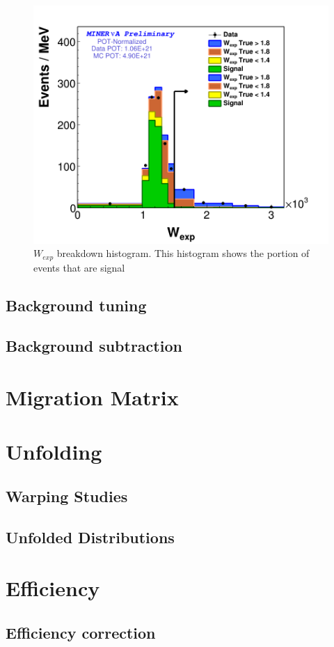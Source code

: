 \begin{figure}
    \centering
    \includegraphics{Figures/Chapter4/BGStudies/Breakdown_WSideband_wexp_fit_1Pi_PN_.png}
    \caption{$W_{exp}$ breakdown histogram. This histogram shows the portion of events that are signal }
    \label{fig:enter-label}
\end{figure}

\subsection{Background tuning}

\subsection{Background subtraction}

\section{Migration Matrix}



\section{Unfolding}

\subsection{Warping Studies}

\subsection{Unfolded Distributions}


\section{Efficiency}

\subsection{Efficiency correction}
